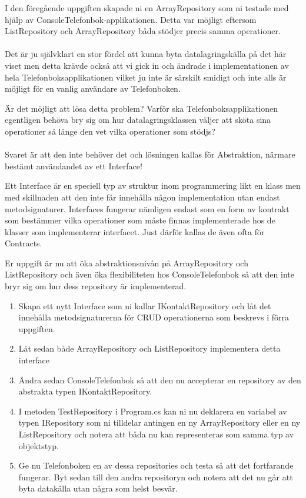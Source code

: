 \documentclass{article}
\begin{document}
I den föregående uppgiften skapade ni en ArrayRepository som ni testade med hjälp av ConsoleTelefonbok-applikationen. Detta var möjligt eftersom ListRepository och ArrayRepository båda stödjer precis samma operationer.\\ \\
Det är ju självklart en stor fördel att kunna byta datalagringskälla på det här viset men detta krävde också att vi gick in och ändrade i implementationen av hela Telefonboksapplikationen vilket ju inte är särskilt smidigt och inte alls är möjligt för en vanlig användare av Telefonboken.

Är det möjligt att lösa detta problem? Varför ska Telefonboksapplikationen egentligen behöva bry sig om hur datalagringsklassen väljer att sköta sina operationer så länge den vet vilka operationer som stödjs? \\ \\Svaret är att den inte behöver det och lösningen kallas för Abstraktion, närmare bestämt användandet av ett Interface!

Ett Interface är en speciell typ av struktur inom programmering likt en klass men med skillnaden att den inte får innehålla någon implementation utan endast metodsignaturer. Interfaces fungerar nämligen endast som en form av kontrakt som bestämmer vilka operationer som måste finnas implementerade hos de klasser som implementerar interfacet. Just därför kallas de även ofta för Contracts.

Er uppgift är nu att öka abstraktionsnivån på ArrayRepository och ListRepository och även öka flexibiliteten hos ConsoleTelefonbok så att den inte bryr sig om hur dess repository är implementerad.

    \begin{enumerate}
                 \item Skapa ett nytt Interface som ni kallar IKontaktRepository och låt det innehålla metodsignaturerna för CRUD operationerna som beskrevs i förra uppgiften.
                 \item Låt sedan både ArrayRepository och ListRepository implementera detta interface
                 \item Ändra sedan ConsoleTelefonbok så att den nu accepterar en repository av den abstrakta typen IKontaktRepository.
                 \item I metoden TestRepository i Program.cs kan ni nu deklarera en variabel av typen IRepository som ni tilldelar antingen en ny ArrayRepository eller en ny ListRepository och notera att båda nu kan representeras som samma typ av objektstyp.
                 \item Ge nu Telefonboken en av dessa repositories och testa så att det fortfarande fungerar. Byt sedan till den andra repositoryn och notera att det nu går att byta datakälla utan några som helst besvär.
    	              
     \end{enumerate}
     
\end{document}

